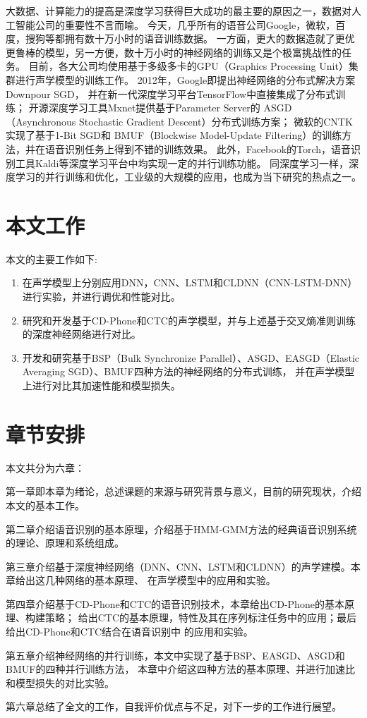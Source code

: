 大数据、计算能力的提高是深度学习获得巨大成功的最主要的原因之一，数据对人工智能公司的重要性不言而喻。
今天，几乎所有的语音公司Google，微软，百度，搜狗等都拥有数十万小时的语音训练数据。
一方面，更大的数据造就了更优更鲁棒的模型，另一方便，数十万小时的神经网络的训练又是个极富挑战性的任务。
目前，各大公司均使用基于多级多卡的GPU（Graphics Processing Unit）集群进行声学模型的训练工作。
2012年，Google即提出神经网络的分布式解决方案Downpour SGD，
并在新一代深度学习平台TensorFlow中直接集成了分布式训练；
开源深度学习工具Mxnet提供基于Parameter Server的
ASGD（Asynchronous Stochastic Gradient Descent）分布式训练方案；
微软的CNTK实现了基于1-Bit SGD和
BMUF（Blockwise Model-Update Filtering）的训练方法，并在语音识别任务上得到不错的训练效果。
此外，Facebook的Torch，语音识别工具Kaldi等深度学习平台中均实现一定的并行训练功能。
同深度学习一样，深度学习的并行训练和优化，工业级的大规模的应用，也成为当下研究的热点之一。


\section{本文工作}

本文的主要工作如下:
\begin{enumerate}
\item 在声学模型上分别应用DNN，CNN、LSTM和CLDNN（CNN-LSTM-DNN）进行实验，并进行调优和性能对比。
\item 研究和开发基于CD-Phone和CTC的声学模型，并与上述基于交叉熵准则训练的深度神经网络进行对比。
\item 开发和研究基于BSP（Bulk Synchronize Parallel）、ASGD、EASGD（Elastic Averaging SGD）、BMUF四种方法的神经网络的分布式训练，
并在声学模型上进行对比其加速性能和模型损失。
\end{enumerate}

\section{章节安排}

本文共分为六章：

第一章即本章为绪论，总述课题的来源与研究背景与意义，目前的研究现状，介绍本文的基本工作。

第二章介绍语音识别的基本原理，介绍基于HMM-GMM方法的经典语音识别系统的理论、原理和系统组成。

第三章介绍基于深度神经网络（DNN、CNN、LSTM和CLDNN）的声学建模。本章给出这几种网络的基本原理、
在声学模型中的应用和实验。

第四章介绍基于CD-Phone和CTC的语音识别技术，本章给出CD-Phone的基本原理、构建策略；
给出CTC的基本原理，特性及其在序列标注任务中的应用；最后给出CD-Phone和CTC结合在语音识别中
的应用和实验。

第五章介绍神经网络的并行训练，本文中实现了基于BSP、EASGD、ASGD和BMUF的四种并行训练方法，
本章中介绍这四种方法的基本原理、并进行加速比和模型损失的对比实验。

第六章总结了全文的工作，自我评价优点与不足，对下一步的工作进行展望。
